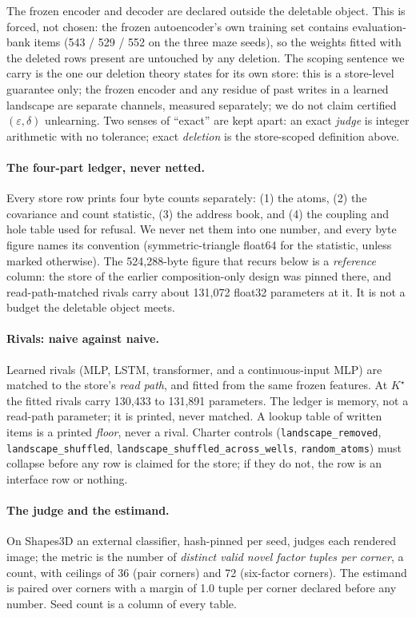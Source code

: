 \documentclass{article}
\newcommand{\Kstar}{\ensuremath{K^{\star}}}
\begin{document}
\noindent The frozen encoder and decoder are declared outside the deletable object. This is
forced, not chosen: the frozen autoencoder's own training set contains evaluation-bank items
(543 / 529 / 552 on the three maze seeds), so the weights fitted with the deleted rows present
are untouched by any deletion.
The scoping sentence we carry is the one our deletion theory states for its own store: this is
a store-level guarantee only; the frozen encoder and any residue of past writes in a learned
landscape are separate channels, measured separately; we do not claim certified
$(\varepsilon,\delta)$ unlearning.
Two senses of ``exact'' are kept apart: an exact \emph{judge} is integer arithmetic with no
tolerance; exact \emph{deletion} is the store-scoped definition above.

\paragraph{The four-part ledger, never netted.} Every store row prints four byte counts
separately: (1) the atoms, (2) the covariance and count statistic, (3) the address book, and
(4) the coupling and hole table used for refusal. We never net them into one number, and every
byte figure names its convention (symmetric-triangle float64 for the statistic, unless marked
otherwise). The 524,288-byte figure that recurs below is a \emph{reference} column: the store
of the earlier composition-only design was pinned there, and read-path-matched rivals carry
about 131,072 float32 parameters at it.
It is not a budget the deletable object meets.

\paragraph{Rivals: naive against naive.} Learned rivals (MLP, LSTM, transformer, and a
continuous-input MLP) are matched to the store's \emph{read path}, and fitted from the same
frozen features. At $\Kstar$ the fitted rivals carry 130,433 to 131,891 parameters.
The ledger is memory, not a read-path parameter; it is printed, never matched. A lookup table
of written items is a printed \emph{floor}, never a rival. Charter controls
(\texttt{landscape\_removed}, \texttt{landscape\_shuffled},
\texttt{landscape\_shuffled\_across\_wells}, \texttt{random\_atoms}) must collapse before any
row is claimed for the store; if they do not, the row is an interface row or nothing.

\paragraph{The judge and the estimand.} On Shapes3D an external classifier, hash-pinned per
seed, judges each rendered image; the metric is the number of \emph{distinct valid novel
factor tuples per corner}, a count, with ceilings of 36 (pair corners) and 72 (six-factor
corners). The estimand is paired over corners with a margin of 1.0 tuple per corner declared
before any number.
Seed count is a column of every table.
\end{document}
